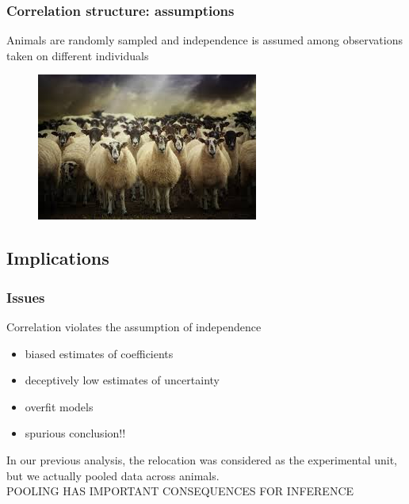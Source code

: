\documentclass[10pt]{beamer}
\begin{document}

\begin{frame}[fragile]
\frametitle{Correlation structure: assumptions}

\begin{center}
Animals are randomly sampled and
independence is assumed among observations taken on different individuals
\begin{figure}
\includegraphics[width=0.8\linewidth]{pictures/sheep}
\end{figure}
\end{center}

\end{frame}



\subsection{Implications}

\begin{frame}[fragile]
\frametitle{Issues}

Correlation violates the assumption of independence\begin{itemize}
\item biased estimates of coefficients
\item deceptively low estimates of uncertainty
\item overfit models
\item spurious conclusion!!
\end{itemize}

\begin{center}
In our previous analysis, the relocation was considered as the experimental unit, but we actually pooled data across animals.\\
\vspace{0.5cm}
POOLING HAS IMPORTANT CONSEQUENCES FOR INFERENCE
\end{center}

\end{frame}
\end{document}
